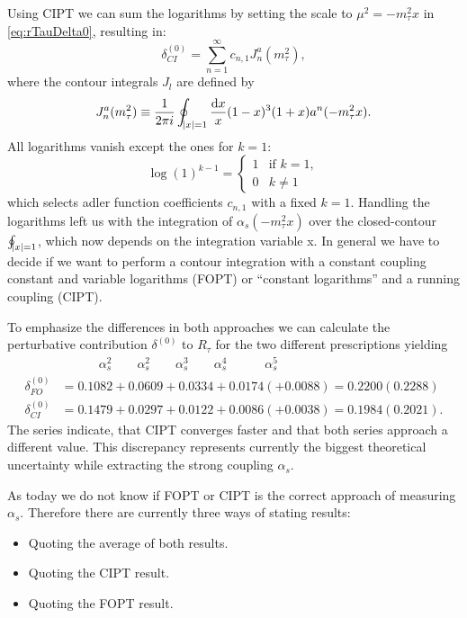 \documentclass[../../index.tex]{subfiles}
\begin{document}
Using CIPT we can sum the logarithms by setting the scale to
$\mu^2 = -m_\tau^2 x$ in \cref{eq:rTauDelta0}, resulting in:
\begin{equation}
  \delta^{(0)}_{CI} = \sum_{n=1}^\infty c_{n,1} J_n^a(m_\tau^2),
\end{equation}
where the contour integrals $J_l$ are defined by
\begin{equation}
  J_n^a(m_\tau^2) \equiv \frac{1}{2 \pi i} \oint_{\abs{x}=1} \frac{\dif x}{x} (1-x)^3(1+x) a^n(-m_\tau^2 x).
\end{equation}
All logarithms vanish except the ones for $k=1$:
\begin{equation}
  \log(1)^{k-1} =  \begin{cases} \mbox{1} & \mbox{if } k=1, \\ \mbox{0} & k\neq 1 \end{cases}
\end{equation}
which selects adler function coefficients $c_{n,1}$ with a fixed $k=1$. Handling the
logarithms left us with the integration of $\alpha_s(- m_\tau^2 x)$ over the closed-contour $\oint_{\abs{x}=1}$, which now
depends on the integration variable x. In general we have to decide if we want
to perform a contour integration with a constant coupling constant and variable
logarithms (FOPT) or ``constant logarithms'' and a running coupling (CIPT).

To emphasize the differences in both approaches we can calculate the
perturbative contribution $\delta^{(0)}$ to $R_\tau$ for the two different
prescriptions yielding \cite{Beneke2008}
\begin{align}
  & \quad\qquad \alpha_s^2 \qquad \alpha_s^2 \qquad \alpha_s^3 \qquad \alpha_s^4 \quad\qquad \alpha_s^5 \nonumber\\
  \delta_{FO}^{(0)} &= 0.1082 + 0.0609 + 0.0334 + 0.0174 (+ 0.0088) = 0.2200 (0.2288) \\
  \delta_{CI}^{(0)} &= 0.1479 + 0.0297 + 0.0122 + 0.0086 (+ 0.0038) = 0.1984 (0.2021).
\end{align}
The series indicate, that CIPT converges faster and that both series approach a
different value. This discrepancy represents currently the biggest theoretical
uncertainty while extracting the strong coupling $\alpha_s$.

As today we do not know if FOPT or CIPT is the correct approach of
measuring $\alpha_s$. Therefore there are currently three ways of stating
results:
\begin{itemize}
  \item Quoting the average of both results.
  \item Quoting the CIPT result.
  \item Quoting the FOPT result.
\end{itemize}
\end{document}
